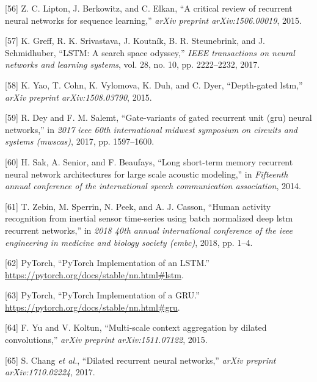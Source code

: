 \documentclass[12pt,]{article}
\begin{document}
\leavevmode\hypertarget{ref-lipton2015critical}{}%
{[}56{]} Z. C. Lipton, J. Berkowitz, and C. Elkan, ``A critical review
of recurrent neural networks for sequence learning,'' \emph{arXiv
preprint arXiv:1506.00019}, 2015.

\leavevmode\hypertarget{ref-greff2017lstm}{}%
{[}57{]} K. Greff, R. K. Srivastava, J. Koutník, B. R. Steunebrink, and
J. Schmidhuber, ``LSTM: A search space odyssey,'' \emph{IEEE
transactions on neural networks and learning systems}, vol. 28, no. 10,
pp. 2222--2232, 2017.

\leavevmode\hypertarget{ref-yao2015depth}{}%
{[}58{]} K. Yao, T. Cohn, K. Vylomova, K. Duh, and C. Dyer,
``Depth-gated lstm,'' \emph{arXiv preprint arXiv:1508.03790}, 2015.

\leavevmode\hypertarget{ref-dey2017gate}{}%
{[}59{]} R. Dey and F. M. Salemt, ``Gate-variants of gated recurrent
unit (gru) neural networks,'' in \emph{2017 ieee 60th international
midwest symposium on circuits and systems (mwscas)}, 2017, pp.
1597--1600.

\leavevmode\hypertarget{ref-sak2014long}{}%
{[}60{]} H. Sak, A. Senior, and F. Beaufays, ``Long short-term memory
recurrent neural network architectures for large scale acoustic
modeling,'' in \emph{Fifteenth annual conference of the international
speech communication association}, 2014.

\leavevmode\hypertarget{ref-zebin2018human}{}%
{[}61{]} T. Zebin, M. Sperrin, N. Peek, and A. J. Casson, ``Human
activity recognition from inertial sensor time-series using batch
normalized deep lstm recurrent networks,'' in \emph{2018 40th annual
international conference of the ieee engineering in medicine and biology
society (embc)}, 2018, pp. 1--4.

\leavevmode\hypertarget{ref-pytorchlstm}{}%
{[}62{]} \relax PyTorch, ``PyTorch Implementation of an LSTM.'' \\
\url{https://pytorch.org/docs/stable/nn.html\#lstm}.

\leavevmode\hypertarget{ref-pytorchgru}{}%
{[}63{]} \relax PyTorch, ``PyTorch Implementation of a GRU.'' \\
\url{https://pytorch.org/docs/stable/nn.html\#gru}.

\leavevmode\hypertarget{ref-yu2015multi}{}%
{[}64{]} F. Yu and V. Koltun, ``Multi-scale context aggregation by
dilated convolutions,'' \emph{arXiv preprint arXiv:1511.07122}, 2015.

\leavevmode\hypertarget{ref-chang2017dilated}{}%
{[}65{]} S. Chang \emph{et al.}, ``Dilated recurrent neural networks,''
\emph{arXiv preprint arXiv:1710.02224}, 2017.
\end{document}
